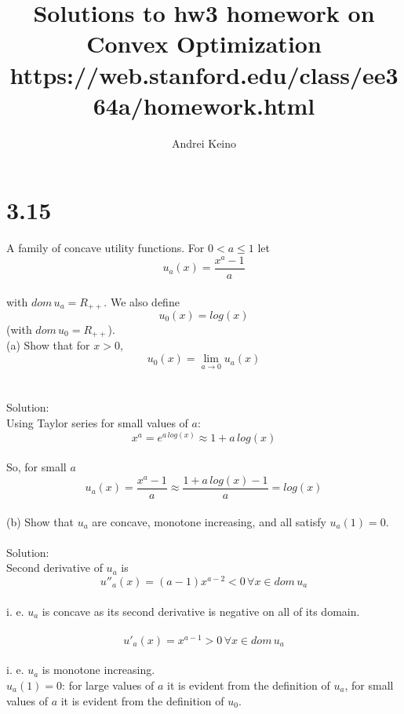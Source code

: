 \documentclass{article}
\begin{document}
\title{Solutions to hw3 homework on Convex Optimization https://web.stanford.edu/class/ee364a/homework.html}
\author{Andrei Keino}
\maketitle
\section*{3.15}

A family of concave utility functions. For $0 < a \leq 1$ let
$$u_a(x) = \frac{x^a - 1}{a}$$\\
with $dom \, u_a = R_{++}$. We also define 
$$u_0(x) = log (x)$$ (with $dom \, u_0 = R_{++}$). \\

(a) Show that for $x > 0$, 
$$u_0(x) = \lim_{a \to 0}{u_a(x)} $$\\ \\
Solution:\\
Using Taylor series for small values of $a$: 
$$x^a = e^{a \, log(x)} \approx 1 + a \,log(x)$$ \\
So, for small 
$a$ $$u_a(x) = \frac{x^a - 1}{a} \approx \frac{1 + a \,log(x) - 1}{a} = log(x)$$ \\

(b) Show that $u_a$ are concave, monotone increasing, and all satisfy $u_a(1) = 0$. \\ \\
Solution:\\
Second derivative of $u_a$ is \\

$$ u''_a(x) = (a - 1) x^{a - 2} < 0 \, \forall x \in dom \, u_a $$\\ i. e. $u_a$ is concave as its second derivative is negative on all of its domain. \\ \\

$$ u'_a(x) = x^{a - 1} > 0 \, \forall x \in dom \, u_a $$\\ i. e. $u_a$ is monotone increasing. \\

$u_a(1) = 0$: for large values of $a$ it is evident from the definition of $u_a$, for small values of $a$ it is evident from the definition of $u_0.$
\end{document}
